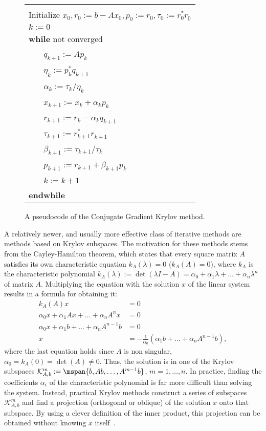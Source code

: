 \begin{figure}
\begin{center}
\begin{tabular}{|l|}
\hline
\\Initialize $x_0, r_0 := b-Ax_0, p_0 := r_0, \tau_0 := r_{0}^* r_{0}^{}$
\\ $k := 0$                                                
\\ {\bf while} not converged
\\ ~~~ $q_{k+1}:=Ap_{k}$                        
\\ ~~~ $\eta_k:=p_{k}^*q_{k+1}^{}$    
\\ ~~~ $\alpha_k:=\tau_k/\eta_k$    
\\ ~~~ $x_{k+1}:=x_k+\alpha_k p_{k}$           
\\ ~~~ $r_{k+1}:=r_k-\alpha_k q_{k+1}$            
\\ ~~~ $\tau_{k+1}:= r_{k+1}^* r_{k+1}^{}$  
\\ ~~~ $\beta_{k+1}:=\tau_{k+1}/\tau_{k}$  
\\ ~~~ $p_{k+1}:= r_{k+1} + \beta_{k+1} p_k$ 

\\ ~~~ $k:=k+1$   
\\ {\bf endwhile}  
\\\hline
\end{tabular}
\end{center}
\caption{A pseudocode of the Conjugate Gradient Krylov method.}
\label{introduction:fig:cg}
\end{figure}

A relatively newer, and usually more effective class of iterative methods are
methods based on Krylov subspaces. The motivation for these methods stems from
the Cayley-Hamilton theorem, which states that every square matrix $A$ satisfies
its own characteristic equation $k_A(\lambda) = 0$ (\ie $k_A(A) = 0$), where
$k_A$ is the characteristic polynomial $k_A(\lambda) := \det(\lambda I - A) =
\alpha_0 + \alpha_1 \lambda + \ldots + \alpha_n \lambda^n$ of matrix $A$.
Multiplying the equation with the solution $x$ of the linear system results in a
formula for obtaining it:
\begin{align}
    k_A(A)x &= 0\\
    \alpha_0 x + \alpha_1 Ax + \ldots + \alpha_n A^n x &= 0\\
    \alpha_0 x + \alpha_1 b + \ldots + \alpha_n A^{n-1} b &= 0\\
    x &= -\frac{1}{\alpha_0}(\alpha_1 b + \ldots + \alpha_n A^{n-1}b),
\end{align}
where the last equation holds since $A$ is non singular, \ie $\alpha_0 = k_A(0)
= \det(A) \neq 0$. Thus, the solution is in one of the Krylov subspaces
$\mathcal{K}_{A, b}^m := \mspan\{b, Ab, \ldots, A^{m-1}b\}$, $m = 1, \ldots, n$.
In practice, finding the coefficients $\alpha_i$ of the characteristic
polynomial is far more difficult than solving the system. Instead, practical
Krylov methods construct a series of subspaces $\mathcal{K}_{A,b}^m$ and find a
projection (orthogonal or oblique) of the solution $x$ onto that subspace. By
using a clever definition of the inner product, this projection can be
obtained without knowing $x$ itself~\cite{demmel,saad}.


